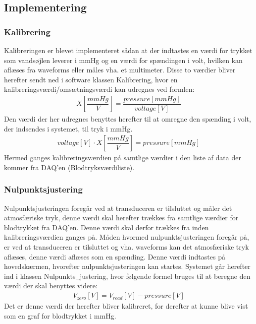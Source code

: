 \subsection{Implementering}
\subsubsection{Kalibrering}
Kalibreringen er blevet implementeret sådan at der indtastes en værdi for trykket som vandsøjlen leverer i mmHg og en værdi for spændingen i volt, hvilken kan aflæses fra waveforms eller måles vha. et multimeter. Disse to værdier bliver herefter sendt ned i software klassen Kalibrering, hvor en kalibreringsværdi/omsætningsværdi kan udregnes ved formlen:
\begin{align}
X\left[\dfrac{mmHg}{V}\right]=\dfrac{pressure \left[mmHg\right]}{voltage \left[V\right]}
\end{align}
Den værdi der her udregnes benyttes herefter til at omregne den spænding i volt, der indsendes i systemet, til tryk i mmHg. 
\begin{align}
voltage \left[V\right]\cdot X\left[\dfrac{mmHg}{V}\right] = pressure \left[mmHg\right]
\end{align}
Hermed ganges kalibreringsværdien på samtlige værdier i den liste af data der kommer fra DAQ'en (Blodtryksværdiliste). 
\subsubsection{Nulpunktsjustering}
Nulpunktsjusteringen foregår ved at transduceren er tilsluttet og måler det atmosfæriske tryk, denne værdi skal herefter trækkes fra samtlige værdier for blodtrykket fra DAQ'en. Denne værdi skal derfor trækkes fra inden kalibreringsværdien ganges på. Måden hvormed nulpunktsjusteringen foregår på, er ved at transduceren er tilsluttet og vha. waveforms kan det atmosfæriske tryk aflæses, denne værdi aflæses som en spænding. Denne værdi indtastes på hovedskærmen, hvorefter nulpunktsjusteringen kan startes. Systemet går herefter ind i klassen Nulpunkts$_{-}$justering, hvor følgende formel bruges til at beregne den værdi der skal benyttes videre:
\begin{align}
V_{zero} \left[V\right]=V_{read}\left[V\right]-pressure \left[V\right] 
\end{align}
Det er denne værdi der herefter bliver kalibreret, for derefter at kunne blive vist som en graf for blodtrykket i mmHg.
